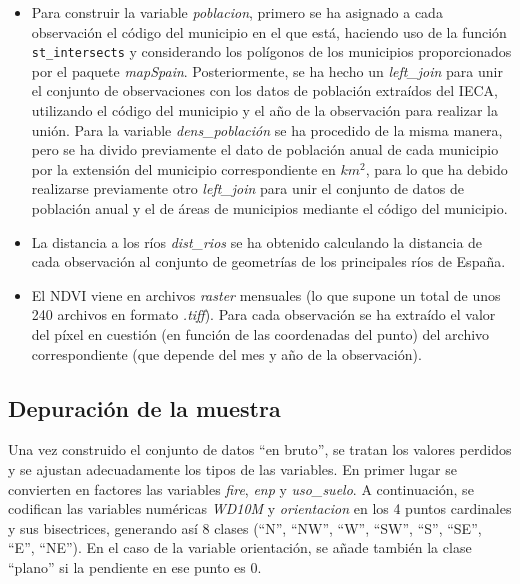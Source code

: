 \documentclass[12pt,a4paper,]{book}
\numberwithin{dummy}{section}
\theoremstyle{ocrenumbox}
\theoremstyle{blacknumex}
\theoremstyle{blacknumbox}
\theoremstyle{ocrenum}
\theoremstyle{ocrenum}
\begin{document}
\begin{itemize}
\item
  Para construir la variable \emph{poblacion}, primero se ha asignado a
  cada observación el código del municipio en el que está, haciendo uso
  de la función \texttt{st\_intersects} y considerando los polígonos de
  los municipios proporcionados por el paquete \emph{mapSpain}.
  Posteriormente, se ha hecho un \emph{left\_join} para unir el conjunto
  de observaciones con los datos de población extraídos del IECA,
  utilizando el código del municipio y el año de la observación para
  realizar la unión. Para la variable \emph{dens\_población} se ha
  procedido de la misma manera, pero se ha divido previamente el dato de
  población anual de cada municipio por la extensión del municipio
  correspondiente en \(km^2\), para lo que ha debido realizarse
  previamente otro \emph{left\_join} para unir el conjunto de datos de
  población anual y el de áreas de municipios mediante el código del
  municipio.
\item
  La distancia a los ríos \emph{dist\_rios} se ha obtenido calculando la
  distancia de cada observación al conjunto de geometrías de los
  principales ríos de España.
\item
  El NDVI viene en archivos \emph{raster} mensuales (lo que supone un
  total de unos 240 archivos en formato \emph{.tiff}). Para cada
  observación se ha extraído el valor del píxel en cuestión (en función
  de las coordenadas del punto) del archivo correspondiente (que depende
  del mes y año de la observación).
\end{itemize}

\hypertarget{depuraciuxf3n-de-la-muestra}{%
\subsection{Depuración de la
muestra}\label{depuraciuxf3n-de-la-muestra}}

Una vez construido el conjunto de datos ``en bruto'', se tratan los
valores perdidos y se ajustan adecuadamente los tipos de las variables.
En primer lugar se convierten en factores las variables \emph{fire},
\emph{enp} y \emph{uso\_suelo}. A continuación, se codifican las
variables numéricas \emph{WD10M} y \emph{orientacion} en los 4 puntos
cardinales y sus bisectrices, generando así 8 clases (``N'', ``NW'',
``W'', ``SW'', ``S'', ``SE'', ``E'', ``NE''). En el caso de la variable
orientación, se añade también la clase ``plano'' si la pendiente en ese
punto es 0.
\end{document}
